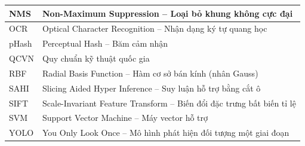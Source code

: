 \begin{longtable}{|p{3.0cm}|p{11.6cm}|}
    NMS & Non-Maximum Suppression -- Loại bỏ khung không cực đại \\ \hline
    OCR & Optical Character Recognition -- Nhận dạng ký tự quang học \\ \hline
    pHash & Perceptual Hash -- Băm cảm nhận \\ \hline
    QCVN & Quy chuẩn kỹ thuật quốc gia \\ \hline
    RBF & Radial Basis Function -- Hàm cơ sở bán kính (nhân Gauss) \\ \hline
    SAHI & Slicing Aided Hyper Inference -- Suy luận hỗ trợ bằng cắt ô \\ \hline
    SIFT & Scale-Invariant Feature Transform -- Biến đổi đặc trưng bất biến tỉ lệ \\ \hline
    SVM & Support Vector Machine -- Máy vector hỗ trợ \\ \hline
    YOLO & You Only Look Once -- Mô hình phát hiện đối tượng một giai đoạn \\ \hline
\end{longtable}
\endgroup
